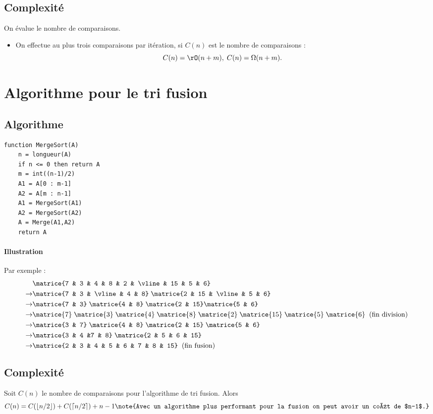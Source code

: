 \documentclass{mybourbaki}
\begin{document}
\subsection{Complexité}
On évalue le nombre de comparaisons.
\begin{itemize}
\item On effectue au plus trois comparaisons par itération, si $C(n)$ est le nombre de comparaisons : \[ C(n) = \rO(n+m), \; C(n) = \Omega(n+m).\]
\end{itemize}


\section{Algorithme pour le tri fusion}
\subsection{Algorithme}
\begin{lstlisting}
function MergeSort(A)
	n = longueur(A)
	if n <= 0 then return A
	m = int((n-1)/2)
	A1 = A[0 : m-1]
	A2 = A[m : n-1]
	A1 = MergeSort(A1)
	A2 = MergeSort(A2)
	A = Merge(A1,A2)
	return A
\end{lstlisting}

\paragraph{Illustration}Par exemple :
\begin{align*}
&\matrice{7 & 3 & 4 & 8 & 2 & \vline & 15 & 5 & 6} \\
\to & \matrice{7 & 3 & \vline & 4 & 8} \; \matrice{2 & 15 & \vline & 5 & 6} \\
\to & \matrice{7 & 3} \; \matrice{4 & 8} \; \matrice{2 & 15} \matrice{5 & 6} \\
\to & \matrice{7} \; \matrice{3} \; \matrice{4} \; \matrice{8} \; \matrice{2} \; \matrice{15} \; \matrice{5} \; \matrice{6} \; \; \text{(fin division)} \\
\to & \matrice{3 & 7} \; \matrice{4 & 8} \; \matrice{2 & 15} \; \matrice{5 & 6} \\
\to &\matrice{3 & 4 &7 & 8} \; \matrice{2 & 5 & 6 & 15} \\
\to &\matrice{2 & 3 & 4 & 5 & 6 & 7 & 8 & 15} \; \; \text{(fin fusion)}
\end{align*}

\subsection{Complexité}
Soit $C(n)$ le nombre de comparaisons pour l'algorithme de tri fusion. Alors \[ C(n) = C(\lfloor n/2 \rfloor) + C(\lceil n/2 \rceil) + n-1\note{Avec un algorithme plus performant pour la fusion on peut avoir un coût de $n-1$.}\]
\end{document}

